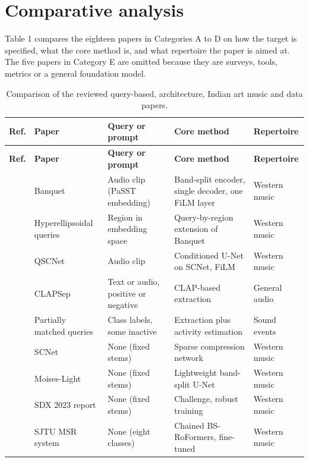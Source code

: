 \documentclass[12pt,a4paper]{article}
\begin{document}
\section{Comparative analysis}

Table 1 compares the eighteen papers in Categories A to D on how the target is specified, what the core method is, and what repertoire the paper is aimed at. The five papers in Category E are omitted because they are surveys, tools, metrics or a general foundation model.

\begingroup\small\renewcommand{\arraystretch}{1.15}
\begin{longtable}{@{}>{\raggedright\arraybackslash}p{0.9cm}>{\raggedright\arraybackslash}p{3.3cm}>{\raggedright\arraybackslash}p{3.5cm}>{\raggedright\arraybackslash}p{4.4cm}>{\raggedright\arraybackslash}p{2.7cm}@{}}
\caption{Comparison of the reviewed query-based, architecture, Indian art music and data papers.}\label{tab:compare}\\
\toprule \textbf{Ref.} & \textbf{Paper} & \textbf{Query or prompt} & \textbf{Core method} & \textbf{Repertoire} \\ \midrule \endfirsthead
\toprule \textbf{Ref.} & \textbf{Paper} & \textbf{Query or prompt} & \textbf{Core method} & \textbf{Repertoire} \\ \midrule \endhead
\bottomrule \endfoot
\cite{banquet} & Banquet & Audio clip (PaSST embedding) & Band-split encoder, single decoder, one FiLM layer & Western music \\
\cite{hyperell} & Hyperellipsoidal queries & Region in embedding space & Query-by-region extension of Banquet & Western music \\
\cite{qscnet} & QSCNet & Audio clip & Conditioned U-Net on SCNet, FiLM & Western music \\
\cite{clapsep} & CLAPSep & Text or audio, positive or negative & CLAP-based extraction & General audio \\
\cite{pmq} & Partially matched queries & Class labels, some inactive & Extraction plus activity estimation & Sound events \\
\cite{scnet} & SCNet & None (fixed stems) & Sparse compression network & Western music \\
\cite{moiseslight} & Moises-Light & None (fixed stems) & Lightweight band-split U-Net & Western music \\
\cite{sdx23} & SDX 2023 report & None (fixed stems) & Challenge, robust training & Western music \\
\cite{sjtu} & SJTU MSR system & None (eight classes) & Chained BS-RoFormers, fine-tuned & Western music \\

\end{longtable}
\end{document}
